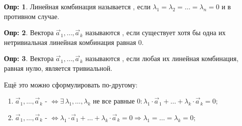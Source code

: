 \documentclass[12pt]{article}
\theoremstyle{definition}
\newtheorem{defn}{Опр:}
\newcommand{\vecm}[1]{\overrightarrow{#1\,}}
\begin{document}
\begin{defn}
	Линейная комбинация называется , если $\lambda_1 = \lambda_2 = \dotsc = \lambda_n = 0$ и  в противном случае.
\end{defn}

\begin{defn}
	Вектора $\vecm{a}_1, \dotsc, \vecm{a}_k$ называются , если существует хотя бы одна их нетривиальная линейная комбинация равная $0$.
\end{defn}

\begin{defn}
		Вектора $\vecm{a}_1, \dotsc, \vecm{a}_k$ называются , если любая их линейная комбинация, равная нулю, является тривиальной.
\end{defn}
Ещё это можно сформулировать по-другому:
\begin{enumerate}[label=\arabic*)]
	\item $\vecm{a}_1, \dotsc, \vecm{a}_k$ -  $\Leftrightarrow \exists\, \lambda_1,\dotsc,\lambda_k$ не все равные $0 \colon \lambda_1{\cdot}\vecm{a}_1 + \dotsc + \lambda_k{\cdot}\vecm{a}_k = 0$;
	\item $\vecm{a}_1, \dotsc, \vecm{a}_k$ -  $\Leftrightarrow  \lambda_1{\cdot}\vecm{a}_1 + \dotsc + \lambda_k{\cdot}\vecm{a}_k = 0 \Rightarrow \lambda_1 = \dotsc = \lambda_k = 0$;
\end{enumerate}
\end{document}
